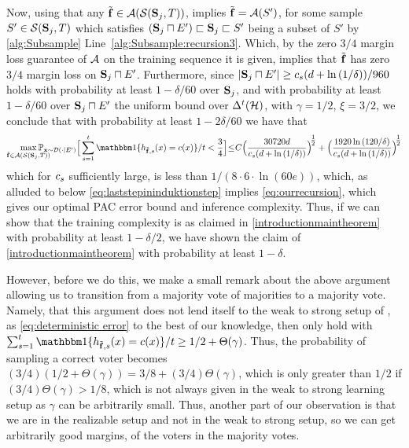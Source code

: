 Now, using that any $ \tilde{\mathbf{f}} \in\mathcal{A}(\mathcal{S}(\mathbf{S}_{j},T))$, implies $ \tilde{\mathbf{f}}=\mathcal{A}(S') $, for some sample $ S'\in\mathcal{S}(\mathbf{S}_{j},T) $ which satisfies  $ (\mathbf{S}_{j}\sqcap E')\sqsubset \mathbf{S}_{j}\sqsubset S'$ being a subset of $ S' $  by \cref{alg:Subsample}  Line~\ref{alg:Subsample:recursion3}. Which, by the zero $ 3/4 $ margin loss guarantee of $ \mathcal{A} $ on the training sequence it is given, implies that $ \tilde{\mathbf{f}} $ has zero $ 3/4 $ margin loss on $ \mathbf{S}_{j}\sqcap E' $. Furthermore, since  $ |\mathbf{S}_{j}\sqcap E'|\geq c_s(d+\ln{\left(1/\delta \right)})/960 $ holds with probability at least $ 1-\delta/60 $ over $ \mathbf{S}_{j} $,  and with probability at least $1-\delta/60 $ over $ \mathbf{S}_{j}\sqcap E' $ the uniform bound over $ \Delta^{t}(\mathcal{H})$, with $ \gamma=1/2 $, $ \xi=3/2 $, we conclude that with probability at least $ 1-2\delta/60 $ we have that 
\vspace{-0.4cm} 
\begin{align*}
  \max_{\rf\in\cA(\cS(\rS_{j},T))}\negmedspace\negmedspace\negmedspace\negmedspace\negmedspace\negmedspace\negmedspace\p_{\rx\sim\cD(\cdot|E')}\Big[ \sum_{s=1}^{t} \ind\{h_{\rf,s}(x)=c(x)\}/t< \frac{3}{4}\Big]\negmedspace\leq\negmedspace C\Big(\frac{30720d}{\cs(d+\ln{\left(1/\delta \right)})}\Big)^{\negmedspace\tfrac{1}{2}}+\Big(\frac{1920\ln{\left(120/\delta \right)}}{\cs(d+\ln{\left(1/\delta \right)})}\Big)^{\negmedspace\tfrac{1}{2}}
  \vspace{-0.4cm}
  \end{align*}        
which for $ c_s$ sufficiently large, is less than $ 1/(8\cdot6\cdot\ln{(60 e)}) $, which, as alluded to below \cref{eq:laststepininduktionstep} implies \cref{eq:ourrecursion}, which gives our optimal PAC error bound and inference complexity. Thus, if we can show that the training complexity is as claimed in \cref{introductionmaintheorem} with probability at least $ 1-\delta/2 $, we have shown the claim of \cref{introductionmaintheorem} with probability at least $ 1-\delta $.

However, before we do this, we make a small remark about the above argument allowing us to transition from a majority vote of majorities to a majority vote. Namely, that this argument does not lend itself to the weak to strong setup of \cite{Optimalweaktostronglearning}, as \cref{eq:deterministic error} to the best of our knowledge, then only hold with $\sum_{s=1}^{t}  \ind\{h_{\rf,s}(x)=c(x)\}/t\geq 1/2+\Theta(\gamma) $. Thus, the probability of sampling a correct voter becomes $ (3/4)(1/2+\Theta(\gamma))=3/8+(3/4)\Theta(\gamma) $, which is only greater than $ 1/2 $ if $ (3/4)\Theta(\gamma)>1/8 $, which is not always given in the weak to strong learning setup as $ \gamma $ can be arbitrarily small. Thus, another part of our observation is that we are in the realizable setup and not in the weak to strong setup, so we can get arbitrarily good margins, of the voters in the majority votes.  

